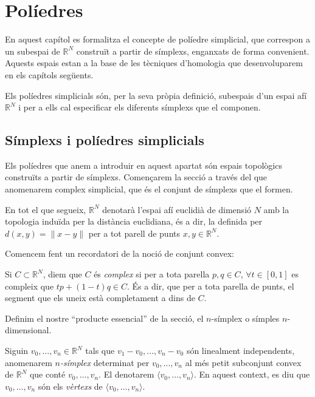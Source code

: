 \documentclass[../main.tex]{subfiles}
\begin{document}
\chapter{Políedres}


En aquest capítol es formalitza el concepte de políedre simplicial, que correspon a un subespai de $\mathbb{R}^N$ construït a partir de símplexs, enganxats de forma convenient. Aquests espais estan a la base de les tècniques d'homologia que desenvoluparem en els capítols següents.

Els políedres simplicials són, per la seva pròpia definició, subespais d'un espai afí $\mathbb{R}^N$ i per a ells cal especificar els diferents símplexs que el componen.


\section{Símplexs i políedres simplicials}

Els políedres que anem a introduir en aquest apartat són espais topològics construïts a partir de símplexs. Començarem la secció a través del que anomenarem complex simplicial, que és el conjunt de símplexs que el formen.

En tot el que segueix, $\mathbb{R}^N$ denotarà l'espai afí euclidià de dimensió $N$ amb la topologia induïda per la distància euclidiana, és a dir, la definida per $d(x,y) = \|x-y\|$ per a tot parell de punts $x,y\in\mathbb{R}^N$.

Comencem fent un recordatori de la noció de conjunt convex:

\begin{defi}[Convex]
Si $C\subset\mathbb{R}^N$, diem que $C$ és \textit{complex} si per a tota parella $p,q\in C$, $\forall t\in[0,1]$ es compleix que $tp+(1-t)q\in C$. És a dir, que per a tota parella de punts, el segment que els uneix està completament a dins de $C$.
\end{defi}

Definim el nostre ``producte essencial'' de la secció, el $n$-símplex o símples $n$-dimensional.

\begin{defi}[$n$-símplex]
Siguin $v_0,\ldots,v_n\in\mathbb{R}^N$ tals que $v_1-v_0,\ldots,v_n-v_0$ són linealment independents, anomenarem \textit{$n$-símplex} determinat per $v_0,\ldots,v_n$ al més petit subconjunt convex de $\mathbb{R}^N$ que conté $v_0,\ldots,v_n$. El denotarem $\langle v_0,\ldots,v_n\rangle$. En aquest context, es diu que $v_0,\ldots,v_n$ són els \textit{vèrtexs} de $\langle v_0,\ldots,v_n\rangle$.
\end{defi}
\end{document}
